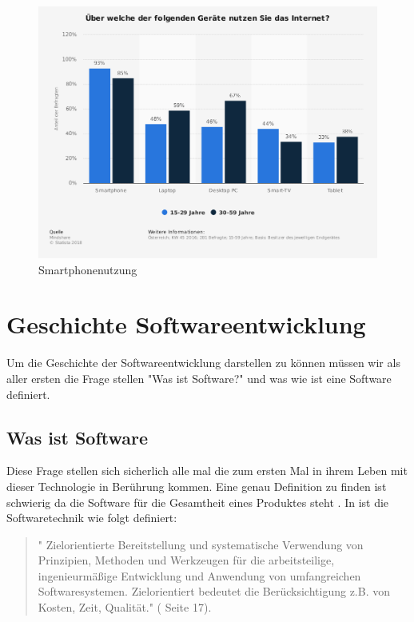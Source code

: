 \begin{figure}[h]
	\centering
	\includegraphics[width=14cm]{BilderAllgemein/SmartPhoneNutzung}\medskip
	\caption{Smartphonenutzung \cite{Geraetenutzung}}
	\label{fig:Smartphonenutzung}
\end{figure}







\section{Geschichte Softwareentwicklung}
Um die Geschichte der Softwareentwicklung darstellen zu können müssen wir als aller ersten die Frage stellen "Was ist Software?" und was wie ist eine Software definiert.
 
\subsection{Was ist Software}
Diese Frage stellen sich sicherlich alle mal die zum ersten Mal in ihrem Leben mit dieser Technologie in Berührung kommen. Eine genau Definition zu finden ist schwierig da die Software für die Gesamtheit eines Produktes steht . In \cite{WasistSoftware} ist die Softwaretechnik wie folgt definiert:

\begin{quote}

" Zielorientierte Bereitstellung und systematische Verwendung von Prinzipien, Methoden und Werkzeugen für
die arbeitsteilige, ingenieurmäßige Entwicklung und Anwendung
von umfangreichen Softwaresystemen. Zielorientiert bedeutet die
Berücksichtigung z.B. von Kosten, Zeit, Qualität." (\cite{WasistSoftware} Seite 17).
\end{quote}

